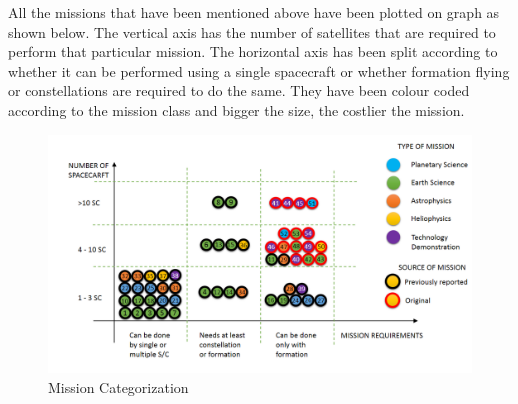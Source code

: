 \vspace{1cm}
All the missions that have been mentioned above have been plotted on graph as shown below. The vertical axis has the number of satellites that are required to perform that particular mission. The horizontal axis has been split according to whether it can be performed using a single spacecraft or whether formation flying or constellations are required to do the same. They have been colour coded according to the mission class and bigger the size, the costlier the mission. 

\begin{figure}[!ht]
\includegraphics[scale=0.5]{cost_function.png}
\caption{Mission Categorization}
\end{figure}
\newpage
%